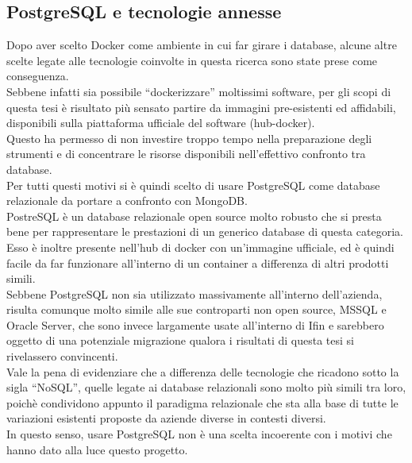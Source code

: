 \subsection{PostgreSQL e tecnologie annesse}
Dopo aver scelto Docker come ambiente in cui far girare i database, alcune altre scelte legate alle tecnologie coinvolte in questa ricerca sono state prese come conseguenza.\\
Sebbene infatti sia possibile ``dockerizzare'' moltissimi software, per gli scopi di questa tesi è risultato più sensato partire da immagini pre-esistenti ed affidabili, disponibili sulla piattaforma ufficiale del software (hub-docker).\\
Questo ha permesso di non investire troppo tempo nella preparazione degli strumenti e di concentrare le risorse disponibili nell'effettivo confronto tra database.\\

\noindent Per tutti questi motivi si è quindi scelto di usare PostgreSQL come database relazionale da portare a confronto con MongoDB.\\
PostreSQL è un database relazionale open source molto robusto che si presta bene per rappresentare le prestazioni di un generico database di questa categoria. Esso è inoltre presente nell'hub di docker con un'immagine ufficiale, ed è quindi facile da far funzionare all'interno di un container a differenza di altri prodotti simili.\\
Sebbene PostgreSQL non sia utilizzato massivamente all'interno dell'azienda, risulta comunque molto simile alle sue controparti non open source, MSSQL e Oracle Server, che sono invece largamente usate all'interno di Ifin e sarebbero oggetto di una potenziale migrazione qualora i risultati di questa tesi si rivelassero convincenti.\\

\noindent Vale la pena di evidenziare che a differenza delle tecnologie che ricadono sotto la sigla ``NoSQL'', quelle legate ai database relazionali sono molto più simili tra loro, poichè condividono appunto il paradigma relazionale che sta alla base di tutte le variazioni esistenti proposte da aziende diverse in contesti diversi.\\
In questo senso, usare PostgreSQL non è una scelta incoerente con i motivi che hanno dato alla luce questo progetto.\\

